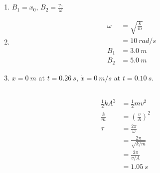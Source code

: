 \documentclass{article}
\begin{document}
\setcounter{subsection}{6}
\subsection{}

\begin{enumerate}
  \item $B_1 = x_0$, $B_2 = \frac{v_0}{\omega}$

  \item

        \begin{align*}
          \omega & = \sqrt{\frac{k}{m}} \\
                 & = \qty{10}{rad/s}    \\
          B_1    & = \qty{3.0}{m}       \\
          B_2    & = \qty{5.0}{m}
        \end{align*}

  \item $x = \qty{0}{m}$ at $t = \qty{0.26}{s}$, $\dot{x} = \qty{0}{m/s}$ at $t = \qty{0.10}{s}$.
\end{enumerate}

\setcounter{subsection}{8}
\subsection{}

\begin{align*}
  \frac{1}{2} k A^2 & = \frac{1}{2} m v^2            \\
  \frac{k}{m}       & = \left( \frac{v}{A} \right)^2 \\
  \tau              & = \frac{2 \pi}{\omega}         \\
                    & = \frac{2 \pi}{\sqrt{k / m}}   \\
                    & = \frac{2 \pi}{v / A}          \\
                    & = \qty{1.05}{s}
\end{align*}

\setcounter{subsection}{10}
\subsection{}
\end{document}
